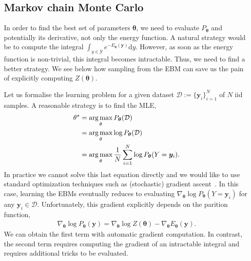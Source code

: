 \subsection{Markov chain Monte Carlo}
In order to find the best set of parameters $\bm{\theta}$, we need to evaluate $P_{\bm{\theta}}$ and potentially its derivative, not only the energy function.
A natural strategy would be to compute the integral $\int_{y\in \mathcal{Y}}e^{-E_{\bm{\theta}}(\bm{y})} \text{d}y$. However, as soon as the energy function is non-trivial, this integral becomes intractable. Thus, we need to find a better strategy. We see below how sampling from the EBM can save us the pain of explicitly computing $Z(\bm{\theta})$.

Let us formalise the learning problem for a given dataset $\mathcal{D} := \{\bm{y}_i\}_{i=1}^N$ of $N$ iid samples. A reasonable strategy is to find the MLE,
\begin{align}
  \theta^\star &= \operatorname*{arg\,max}_\theta P_{\bm{\theta}}(\mathcal{D})\\
  &= \operatorname*{arg\,max}_\theta \log P_{\bm{\theta}}(\mathcal{D})\\
  &= \operatorname*{arg\,max}_\theta \frac{1}{N} \sum^N_{i=1} \log P_{\bm{\theta}}(Y=\bm{y}_i).
\end{align}
In practice we cannot solve this last equation directly and we would like to use standard optimization techniques such as (stochastic) gradient ascent~\citep{amari1993backpropagation, bottou2012stochastic}. In this case, learning the EBMs eventually reduces to evaluating $\nabla_{\bm{\theta}} \log P_{\bm{\theta}}(Y=\bm{y}_i)$ for any $\bm{y}_i \in \mathcal{D}$. Unfortunately, this gradient explicitly depends on the parition function,
\begin{align}
  \nabla_{\bm{\theta}} \log P_{\bm{\theta}}(\bm{y}) = \nabla_{\bm{\theta}} \log Z(\bm{\theta}) -\nabla_{\bm{\theta}} E_{\bm{\theta}}(\bm{y}).
\end{align}
We can obtain the first term with automatic gradient computation. In contrast, the second term requires computing the gradient of an intractable integral and requires additional tricks to be evaluated.

